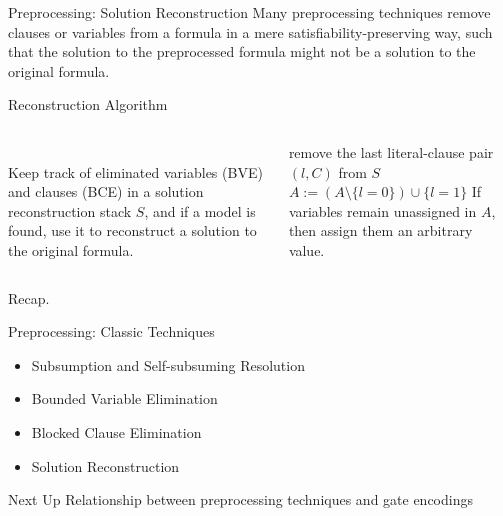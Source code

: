\documentclass[t]{sdqbeamer}
\begin{document}
\begin{frame}{Preprocessing: Solution Reconstruction}
Many preprocessing techniques remove clauses or variables from a formula in a mere satisfiability-preserving way, such that the solution to the preprocessed formula might not be a solution to the original formula.\\[1ex]
\begin{block}{Reconstruction Algorithm}
\begin{columns}[T]
\begin{column}{.35\linewidth}
~\\
Keep track of eliminated variables (BVE) and clauses (BCE) in a solution reconstruction stack $S$, and if a model is found, use it to reconstruct a solution to the original formula.
\end{column}
\begin{column}{.55\linewidth}
\begin{algorithm}[H]
\caption{Solution Reconstruction}
 {
    remove the last literal-clause pair $(l,C)$ from $S$\;
     {
        $A := (A \setminus \{l = 0\}) \cup \{l = 1\}$
    }
}
\BlankLine
If variables remain unassigned in $A$, then assign them an arbitrary value.
\end{algorithm}
\end{column}
\end{columns}
\end{block}
\end{frame}


\begin{frame}{Recap.}
\begin{block}{Preprocessing: Classic Techniques}
\begin{itemize}\setlength{\itemsep}{1ex}
    \item Subsumption and Self-subsuming Resolution
    \item Bounded Variable Elimination
    \item Blocked Clause Elimination
    \item Solution Reconstruction
\end{itemize}
\end{block}
\begin{block}{Next Up}
Relationship between preprocessing techniques and gate encodings
\end{block}
\end{frame}
\end{document}
